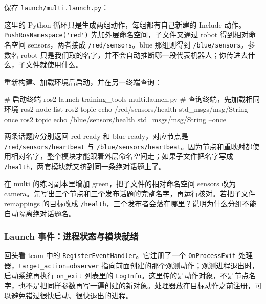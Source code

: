 \begin{example}
保存 \nolinkurl{launch/multi.launch.py}：
\par\medskip\noindent\begin{minipage}{\linewidth}

\end{minipage}\par\smallskip

这里的 Python 循环只是生成两组动作，每组都有自己新建的 Include 动作。\nolinkurl{PushRosNamespace('red')} 先加外层命名空间，子文件又通过 robot 得到相对命名空间 sensors，两者接成 \texttt{/red/sensors}。blue 那组则得到 \texttt{/blue/sensors}。参数名 robot 只是我们取的名字，并不会自动推断哪一段代表机器人；你传进去什么，子文件就使用什么。

重新构建、加载环境后启动，并在另一终端查询：
\par\medskip\noindent\begin{minipage}{\linewidth}
\begin{tbash}
# 启动终端
ros2 launch training_tools multi.launch.py
# 查询终端，先加载相同环境
ros2 node list
ros2 topic echo /red/sensors/health std_msgs/msg/String --once
ros2 topic echo /blue/sensors/health std_msgs/msg/String --once
\end{tbash}
\end{minipage}\par\smallskip
两条话题应分别返回 red ready 和 blue ready，对应节点是 \nolinkurl{/red/sensors/heartbeat} 与 \nolinkurl{/blue/sensors/heartbeat}。因为节点和重映射都使用相对名字，整个模块才能跟着外层命名空间走；如果子文件把名字写成 \texttt{/health}，两套模块就又挤到同一条绝对话题上了。
\end{example}

\begin{exercise}
\label{ex:v2-ros-launch-group}
在 multi 的练习副本里增加 green，把子文件的相对命名空间 sensors 改为 camera。先写出三个节点和三个发布话题的完整名字，再运行核对。若把子文件 remappings 的目标改成 \texttt{/health}，三个发布者会落在哪里？说明为什么分组不能自动隔离绝对话题名。
\end{exercise}

\subsubsection{Launch 事件：进程状态与模块就绪}
回头看 team 中的 \nolinkurl{RegisterEventHandler}。它注册了一个 \texttt{OnProcessExit} 处理器，\nolinkurl{target_action=observer} 指向前面创建的那个观测动作；观测进程退出时，启动系统再执行 \texttt{on\_exit} 列表里的 \texttt{LogInfo}。这里传的是动作对象，不是节点名字，也不是把同样参数再写一遍创建的新对象。处理器放在目标动作之前注册，可以避免错过很快启动、很快退出的进程。


